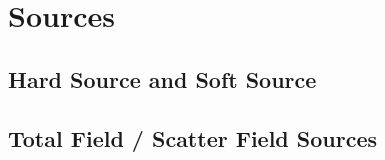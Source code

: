 \section{Sources}
\subsection{Hard Source and Soft Source}
\subsection{Total Field / Scatter Field Sources}
